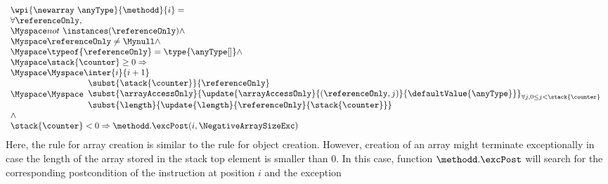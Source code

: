 \begin{itemize}
\begin{enumerate}
				 $$\begin{array}{l}
                                         \wpi{\newarray  \ \anyType } {\methodd}{i}  =  \\
			\forall \referenceOnly,\\
                        \Myspace    not \ \instances(\referenceOnly) \wedge \\
			 \Myspace \referenceOnly \neq \Mynull \wedge \\
			\Myspace \typeof{\referenceOnly} = \type{\anyType[ ]} \wedge \\
			 	\Myspace \stack{\counter} \ge 0 \Rightarrow  \\
					 \Myspace     \Myspace  \inter{i}{i+1} \\
                                           \Myspace      \Myspace \begin{array}{l}        
						        \subst{\stack{\counter} }{ \referenceOnly } \\
							\subst{ \arrayAccessOnly }{ \update{\arrayAccessOnly}
                                                                                           {(\referenceOnly, j ) }
                                                                                         {\defaultValue{\anyType} } }_{ { \small \forall j , 0 \leq  j < \stack{\counter} } } \\
                                                          \subst{\length}{\update{\length}{\referenceOnly}{\stack{\counter} } }     
						   \end{array} \\
							\wedge \\
						\stack{\counter} < 0 \Rightarrow    \methodd.\excPost( i, \NegativeArraySizeExc) \\
                                    \end{array} $$
		  Here, the rule for array creation is similar to the rule for object creation.
		  However, creation of an array might terminate exceptionally in case the length of the array stored 
		  in the stack top element \stack{\counter} is smaller than $0$. In this case, function $\methodd.\excPost$ will search for the corresponding postcondition 
		  of the instruction at position $i$ and the exception \NegativeArraySizeExc
		

\end{enumerate}
\end{itemize}
